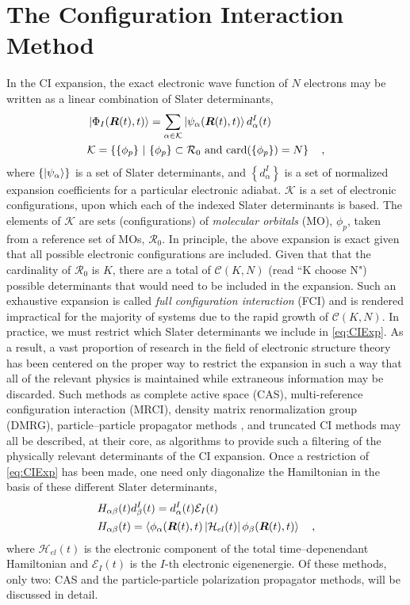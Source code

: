 \section{The Configuration Interaction Method}
\label{sec:ci}

In the CI expansion, the exact electronic wave function of $N$ electrons may be
written as a linear combination of Slater determinants,
\begin{align}
&\left\vert \Phi_I (\boldsymbol{R}(t),t) \right\rangle = \sum_{\alpha \in \mathcal{K}}  
  \left\vert \psi_\alpha (\boldsymbol{R}(t),t) \right\rangle d^I_\alpha(t)
\label{eq:CIExp} \\
& \mathcal{K} = \left\lbrace \{ \phi_p \} \text{ }\vert\text{ } \{ \phi_p \} \subset
\mathcal{R}_0 \text{ and } \mathrm{card}(\{ \phi_p \}) = N \right\rbrace
\quad ,
\end{align}
where $\left\lbrace\left\vert \psi_\alpha \right\rangle\right\rbrace$ is a set of Slater
determinants, and $\left\lbrace d^I_\alpha \right\rbrace$ is a set of normalized
expansion coefficients for a particular electronic adiabat. $\mathcal{K}$ is a
set of electronic configurations, upon which each of the indexed Slater
determinants is based. The elements of $\mathcal{K}$ are sets (configurations)
of \emph{molecular orbitals} (MO), $\phi_p$, taken from a reference set of MOs,
$\mathcal{R}_0$.  In principle, the above expansion is exact given that all
possible electronic configurations are included.  Given that that the
cardinality of $\mathcal{R}_0$ is $K$, there are a total of $\mathcal{C}(K,N)$
(read ``K choose N") possible determinants that would need to be included in the
expansion. Such an exhaustive expansion is called \emph{full configuration
interaction} (FCI) and is rendered impractical for the majority of systems due
to the rapid growth of $\mathcal{C}(K,N)$.  In practice, we  must restrict which
Slater determinants we include in \cref{eq:CIExp}. As a result, a vast
proportion of research in the field of electronic structure theory has been
centered on the proper way to restrict the expansion in such a way that all of
the relevant physics is maintained while extraneous information may be
discarded. Such methods as complete active space (CAS), multi-reference
configuration interaction (MRCI), density matrix renormalization group (DMRG),
particle--particle propagator methods , and truncated CI methods may all be
described, at their core, as algorithms to provide such a filtering of the
physically relevant determinants of the CI expansion.  Once a restriction of
\cref{eq:CIExp} has been made, one need only diagonalize the Hamiltonian in the
basis of these different Slater determinants,
\begin{align}
&H_{\alpha\beta}(t) d_\beta^I(t) = d_\alpha^I(t) \mathcal{E}_I(t)\\
&H_{\alpha\beta}(t) =
\left\langle \phi_\alpha(\boldsymbol{R}(t),t) \left\vert \mathcal{H}_{el}(t) \right\vert \phi_\beta(\boldsymbol{R}(t),t) \right\rangle
\quad,
\end{align}
where $\mathcal{H}_{el}(t)$ is the electronic component of the total
time--depenendant Hamiltonian and $\mathcal{E}_I(t)$ is the $I$-th electronic
eigenenergie. 
Of these methods, only two: CAS and the particle-particle polarization
propagator methods, will be discussed in detail. 
